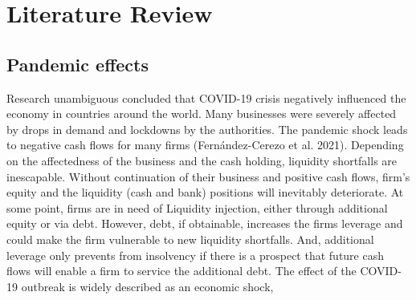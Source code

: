 
\chapter{Literature Review} %

\label{ChapterX} %


\section{Pandemic effects}

Research unambiguous concluded that COVID-19 crisis negatively influenced the economy in countries around the world. Many businesses were severely affected by drops in demand and lockdowns by the authorities. The pandemic shock leads to negative cash flows for many firms (Fernández-Cerezo et al. 2021). Depending on the affectedness of the business and the cash holding, liquidity shortfalls are inescapable. 
Without continuation of their business and positive cash flows, firm’s equity and the liquidity (cash and bank) positions will inevitably deteriorate. At some point, firms are in need of Liquidity injection, either through additional equity or via debt. However, debt, if obtainable, increases the firms leverage and could make the firm vulnerable to new liquidity shortfalls. And, additional leverage only prevents from insolvency if there is a prospect that future cash flows will enable a firm to service the additional debt.
The effect of the COVID-19 outbreak is widely described as an economic shock,

